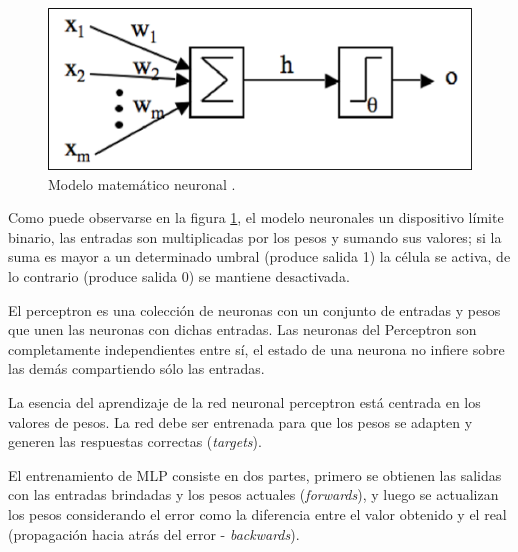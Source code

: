 \begin{figure}
\begin{centering}
\includegraphics[scale=0.85]{images/McCulloch-Pitts}
\par\end{centering}

\caption{Modelo matemático neuronal . \label{fig:McCulloch-Pitts}}
\end{figure}


Como puede observarse en la figura \ref{fig:McCulloch-Pitts}, el
modelo neuronales un dispositivo límite binario, las entradas son
multiplicadas por los pesos y sumando sus valores; si la suma es mayor
a un determinado umbral (produce salida 1) la célula se activa, de
lo contrario (produce salida 0) se mantiene desactivada.

El perceptron es una colección de neuronas con un conjunto de entradas
y pesos que unen las neuronas con dichas entradas. Las neuronas del
Perceptron son completamente independientes entre sí, el estado de
una neurona no infiere sobre las demás compartiendo sólo las entradas.

La esencia del aprendizaje de la red neuronal perceptron está centrada
en los valores de pesos. La red debe ser entrenada para que los pesos
se adapten y generen las respuestas correctas (\emph{targets}).

El entrenamiento de \ac{MLP} consiste en dos partes, primero se obtienen
las salidas con las entradas brindadas y los pesos actuales (\emph{forwards}),
y luego se actualizan los pesos considerando el error como la diferencia
entre el valor obtenido y el real (propagación hacia atrás del error
- \emph{backwards}). 

